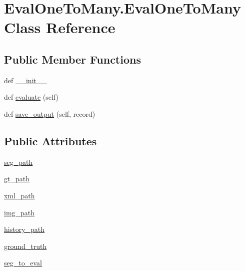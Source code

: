 \hypertarget{class_eval_one_to_many_1_1_eval_one_to_many}{}\section{Eval\+One\+To\+Many.\+Eval\+One\+To\+Many Class Reference}
\label{class_eval_one_to_many_1_1_eval_one_to_many}
\subsection*{Public Member Functions}
\begin{DoxyCompactItemize}
\item 
def \hyperlink{class_eval_one_to_many_1_1_eval_one_to_many_af1e44dca57d0358bfc91a411549b48c2}{\+\_\+\+\_\+init\+\_\+\+\_\+}
\item 
def \hyperlink{class_eval_one_to_many_1_1_eval_one_to_many_a0e9e6e1446fde5105b66dea2bc8d105c}{evaluate} (self)
\item 
def \hyperlink{class_eval_one_to_many_1_1_eval_one_to_many_ae0cbef3a0dbd2079efac4dce47fb8c05}{save\+\_\+output} (self, record)
\end{DoxyCompactItemize}
\subsection*{Public Attributes}
\begin{DoxyCompactItemize}
\item 
\hyperlink{class_eval_one_to_many_1_1_eval_one_to_many_aa75b7329272bbaad55120d3762b1b056}{seg\+\_\+path}
\item 
\hyperlink{class_eval_one_to_many_1_1_eval_one_to_many_a53b4382df901cab057e1c39a1d9c7697}{gt\+\_\+path}
\item 
\hyperlink{class_eval_one_to_many_1_1_eval_one_to_many_a136344598ed0090ca9fc43cd7104ea5c}{xml\+\_\+path}
\item 
\hyperlink{class_eval_one_to_many_1_1_eval_one_to_many_a16f9ad0eb0e5943a28ef72c8fff03843}{img\+\_\+path}
\item 
\hyperlink{class_eval_one_to_many_1_1_eval_one_to_many_a5d545be4c030b25aeb0d4ad897ddc65a}{history\+\_\+path}
\item 
\hyperlink{class_eval_one_to_many_1_1_eval_one_to_many_ace585d7266afcbe0b9fb99a3bced6008}{ground\+\_\+truth}
\item 
\hyperlink{class_eval_one_to_many_1_1_eval_one_to_many_a8b1c055143abffdd68385d0d8592a8f9}{seg\+\_\+to\+\_\+eval}
\end{DoxyCompactItemize}
